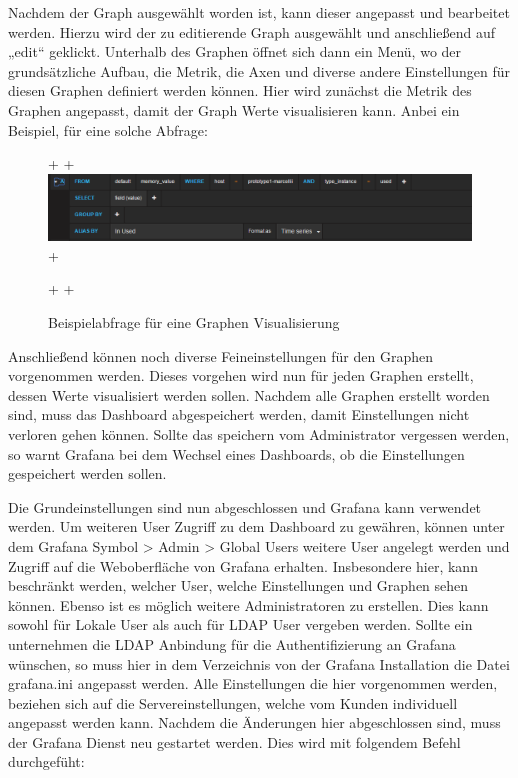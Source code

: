 Nachdem der Graph ausgewählt worden ist, kann dieser angepasst und bearbeitet
werden. Hierzu wird der zu editierende Graph ausgewählt und anschließend auf
„edit“ geklickt. Unterhalb des Graphen öffnet sich dann ein Menü, wo der
grundsätzliche Aufbau, die Metrik, die Axen und diverse andere Einstellungen
für diesen Graphen definiert werden können. Hier wird zunächst die Metrik des
Graphen angepasst, damit der Graph Werte visualisieren kann.  Anbei ein
Beispiel, für eine solche Abfrage:

\begin{figure}[tbp]
 +  \centering
 +  \includegraphics[width=1.0\textwidth]{../figures/graph.png}
 +  \caption{Beispielabfrage für eine Graphen Visualisierung}
 +\label{figure:graph}
 +\end{figure}

Anschließend können noch diverse Feineinstellungen für den Graphen vorgenommen
werden. Dieses vorgehen wird nun für jeden Graphen erstellt, dessen Werte
visualisiert werden sollen. Nachdem alle Graphen erstellt worden sind, muss das
Dashboard abgespeichert werden, damit Einstellungen nicht verloren gehen
können. Sollte das speichern vom Administrator vergessen werden, so warnt
Grafana bei dem Wechsel eines Dashboards, ob die Einstellungen gespeichert
werden sollen.

Die Grundeinstellungen sind nun abgeschlossen und Grafana kann verwendet
werden. Um weiteren User Zugriff zu dem Dashboard zu gewähren, können unter dem
Grafana Symbol > Admin > Global Users weitere User angelegt werden und Zugriff
auf die Weboberfläche von Grafana erhalten. Insbesondere hier, kann beschränkt
werden, welcher User, welche Einstellungen und Graphen sehen können. Ebenso ist
es möglich weitere Administratoren zu erstellen. Dies kann sowohl für Lokale
User als auch für LDAP User vergeben werden.  Sollte ein unternehmen die LDAP
Anbindung für die Authentifizierung an Grafana wünschen, so muss hier in dem
Verzeichnis von der Grafana Installation die Datei grafana.ini angepasst
werden. Alle Einstellungen die hier vorgenommen werden, beziehen sich auf die
Servereinstellungen, welche vom Kunden individuell angepasst werden kann.
Nachdem die Änderungen hier abgeschlossen sind, muss der Grafana Dienst neu
gestartet werden. Dies wird mit folgendem Befehl durchgefüht:

